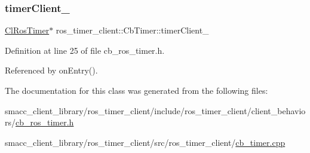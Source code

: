 \mbox{\label{classros__timer__client_1_1CbTimer_a370d115a7423db45ca375673db8a4ed1}} 
\subsubsection{\texorpdfstring{timer\+Client\+\_\+}{timerClient\_}}
{\footnotesize\ttfamily \hyperlink{classros__timer__client_1_1ClRosTimer}{Cl\+Ros\+Timer}$\ast$ ros\+\_\+timer\+\_\+client\+::\+Cb\+Timer\+::timer\+Client\+\_\+\hspace{0.3cm}{\ttfamily [private]}}



Definition at line 25 of file cb\+\_\+ros\+\_\+timer.\+h.



Referenced by on\+Entry().



The documentation for this class was generated from the following files\+:\begin{DoxyCompactItemize}
\item 
smacc\+\_\+client\+\_\+library/ros\+\_\+timer\+\_\+client/include/ros\+\_\+timer\+\_\+client/client\+\_\+behaviors/\hyperlink{cb__ros__timer_8h}{cb\+\_\+ros\+\_\+timer.\+h}\item 
smacc\+\_\+client\+\_\+library/ros\+\_\+timer\+\_\+client/src/ros\+\_\+timer\+\_\+client/\hyperlink{cb__timer_8cpp}{cb\+\_\+timer.\+cpp}\end{DoxyCompactItemize}

